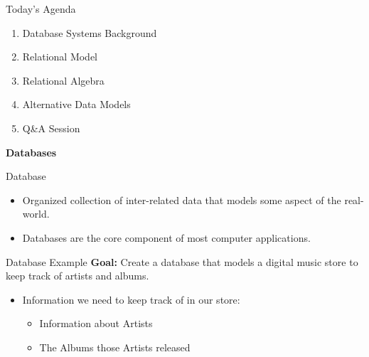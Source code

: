 \documentclass[aspectratio=169, 10pt]{beamer}
\begin{document}
\begin{frame}{Today's Agenda}
    \begin{enumerate}
        \item Database Systems Background
        \item Relational Model
        \item Relational Algebra
        \item Alternative Data Models
        \item Q\&A Session
    \end{enumerate}
\end{frame}

\begin{frame}
    \centering
    \Huge \textbf{Databases}
\end{frame}

\begin{frame}{Database}
    \Large
    \begin{itemize}
        \item Organized collection of inter-related data that models some aspect of the real-world.
        \item Databases are the core component of most computer applications.
    \end{itemize}
\end{frame}

\begin{frame}{Database Example}
    \textbf{Goal:} Create a database that models a digital music store to keep track of artists and albums.
    \vspace{1em}
    \begin{itemize}
        \item Information we need to keep track of in our store:
        \begin{itemize}
            \item Information about Artists
            \item The Albums those Artists released
        \end{itemize}
    \end{itemize}
\end{frame}
\end{document}
